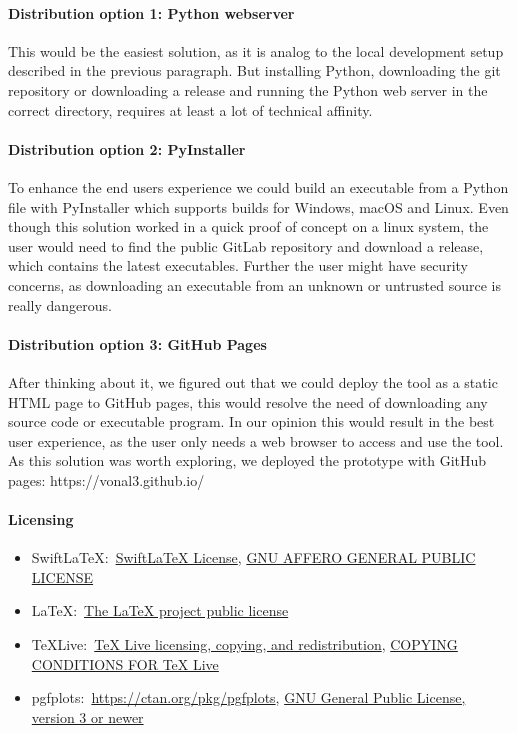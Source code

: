 \paragraph{Distribution option 1: Python webserver}\mbox{}\newline
This would be the easiest solution, as it is analog to the local development setup described in the previous paragraph.
But installing Python, downloading the git repository or downloading a release and running the Python web server in the correct directory, requires at least a lot of technical affinity.

\paragraph{Distribution option 2: PyInstaller}\mbox{}\newline
To enhance the end users experience we could build an executable from a Python file with PyInstaller which supports builds for Windows, macOS and Linux.
Even though this solution worked in a quick proof of concept on a linux system, the user would need to find the public GitLab repository and download a release, which contains the latest executables.
Further the user might have security concerns, as downloading an executable from an unknown or untrusted source is really dangerous.

\paragraph{Distribution option 3: GitHub Pages}\mbox{}\newline
After thinking about it, we figured out that we could deploy the tool as a static HTML page to GitHub pages, this would resolve the need of downloading any source code or executable program.
In our opinion this would result in the best user experience, as the user only needs a web browser to access and use the tool.
As this solution was worth exploring, we deployed the prototype with GitHub pages: https://vonal3.github.io/

\paragraph{Licensing}
\begin{itemize}
    \item SwiftLaTeX:\ \href{https://github.com/SwiftLaTeX/SwiftLaTeX/blob/master/LICENSE}{SwiftLaTeX License}, \href{https://www.gnu.org/licenses/agpl-3.0.en.html}{GNU AFFERO GENERAL PUBLIC LICENSE}
    \item LaTeX:\ \href{https://www.latex-project.org/lppl.txt}{The LaTeX project public license}
    \item TeXLive:\ \href{https://www.tug.org/texlive/copying.html}{TeX Live licensing, copying, and redistribution}, \href{https://www.tug.org/texlive/LICENSE.TL}{COPYING CONDITIONS FOR TeX Live}
    \item pgfplots:\ \href{https://ctan.org/pkg/pgfplots}{https://ctan.org/pkg/pgfplots}, \href{https://www.gnu.org/licenses/gpl-3.0.en.html}{GNU General Public License, version 3 or newer}
\end{itemize}

